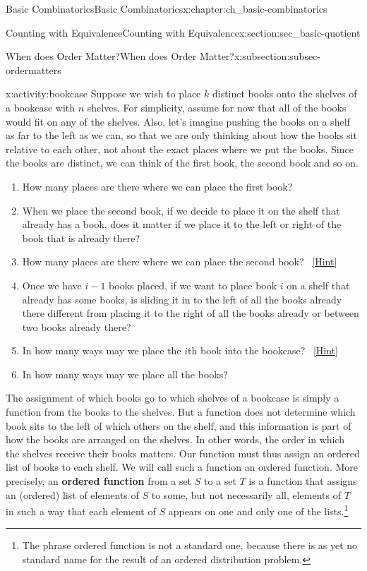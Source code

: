 \documentclass[oneside,10pt,]{book}
\newcommand{\terminology}[1]{\textbf{#1}}
\numberwithin{equation}{chapter}
\begin{document}
\begin{chapterptx}{Basic Combinatorics}{}{Basic Combinatorics}{}{}{x:chapter:ch_basic-combinatorics}
\begin{sectionptx}{Counting with Equivalence}{}{Counting with Equivalence}{}{}{x:section:sec_basic-quotient}
\begin{subsectionptx}{When does Order Matter?}{}{When does Order Matter?}{}{}{x:subsection:subsec-ordermatters}
\begin{activity}{}{x:activity:bookcase}
Suppose we wish to place \(k\) distinct books onto the shelves of a bookcase with \(n\) shelves. For simplicity, assume for now that all of the books would fit on any of the shelves. Also, let's imagine pushing the books on a shelf as far to the left as we can, so that we are only thinking about how the books sit relative to each other, not about the exact places where we put the books. Since the books are distinct, we can think of the first book, the second book and so on.%
\begin{enumerate}[font=\bfseries,label=(\alph*),ref=\alph*]
\item{}How many places are there where we can place the first book?%
\item{}When we place the second book, if we decide to place it on the shelf that already has a book, does it matter if we place it to the left or right of the book that is already there?%
\item{}How many places are there where we can place the second book?%
\qquad~\hfill{\tiny\hyperlink{g:hint:idm2208-back}{[Hint]}}\item{}Once we have \(i-1\) books placed, if we want to place book \(i\)  on a shelf that already has some books, is sliding it in to the left of all the books already there different from placing it to the right of all the books already or between two books already there?%
\item{}In how many ways may we place the \(i\)th book into the bookcase?%
\qquad~\hfill{\tiny\hyperlink{g:hint:idm2224-back}{[Hint]}}\item{}In how many ways may we place all the books?%
\end{enumerate}
\end{activity}
The assignment of which books go to which shelves of a bookcase is simply a function from the books to the shelves. But a function does not determine which book sits to the left of which others on the shelf, and this information is part of how the books are arranged on the shelves. In other words, the order in which the shelves receive their books matters.  Our function must thus assign an ordered list of books to each shelf. We will call such a function an ordered function. More precisely, an \terminology{ordered function} from a set \(S\) to a set \(T\) is a function that assigns an (ordered) list of elements of \(S\) to some, but not necessarily all, elements of \(T\) in such a way that each element of \(S\) appears on one and only one of the lists.\footnote{The phrase ordered function is not a standard one, because there is as yet no standard name for the result of an ordered distribution problem.\label{g:fn:idm2252}}%

\end{subsectionptx}
\end{sectionptx}
\end{chapterptx}
\end{document}

